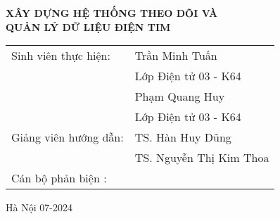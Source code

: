   \begin{center}
     \textbf{\fontsize{20pt}{0pt}\selectfont XÂY DỰNG HỆ THỐNG THEO DÕI VÀ} \\
     \textbf{\fontsize{20pt}{0pt}\selectfont QUẢN LÝ DỮ LIỆU ĐIỆN TIM }
  
  \vspace{1.5cm}
  \begin{table}[H]
       \centering
       
       \begin{tabular}{l l}
            \fontsize{14pt}{0pt}\selectfont Sinh viên thực hiện:      & \fontsize{14pt}{0pt}\selectfont Trần Minh Tuấn \\
            &\fontsize{14pt}{0pt}\selectfont Lớp Điện tử 03 - K64 \vspace{6pt} \\
            &\fontsize{14pt}{0pt}\selectfont Phạm Quang Huy  \\
            &\fontsize{14pt}{0pt}\selectfont Lớp Điện tử 03 - K64 \vspace{6pt} \\
            \fontsize{14pt}{0pt}\selectfont Giảng viên hướng dẫn: & \fontsize{14pt}{0pt}\selectfont TS. Hàn Huy Dũng  \vspace{6pt} \\  
              &\fontsize{14pt}{0pt}\selectfont TS. Nguyễn Thị Kim Thoa \vspace{6pt} \\
            \fontsize{14pt}{0pt}\selectfont Cán bộ phản biện : &
       \end{tabular}
  \end{table}
  \vspace{0.4cm} %
  \fontsize{14pt}{0pt}\selectfont Hà Nội 07-2024
  \end{center}
  
  \cleardoublepage %
  